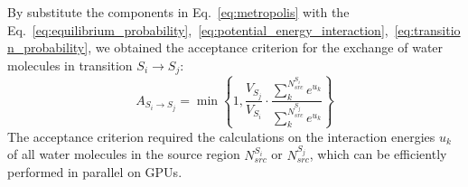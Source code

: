 \documentclass[journal=jacsat,manuscript=article]{achemso}
\begin{document}
By substitute the components in Eq.~\ref{eq:metropolis} with the Eq.~\ref{eq:equilibrium_probability},~\ref{eq:potential_energy_interaction},~\ref{eq:transition_probability},
we obtained the acceptance criterion for the exchange of water molecules in transition $S_i \to S_j$:
\begin{equation}\label{eq:acceptance_criterion}
A_{S_i \to S_j} = \min \left\{1, \frac{V_{S_j}}{V_{S_i}} \cdot \frac{\sum^{N^{S_i}_{src}}_k{e^{u_k}}}{\sum^{N^{S_j}_{src}}_k{e^{u_k}}} \right\}
\end{equation}
\noindent The acceptance criterion required the calculations on the interaction energies $u_k$ of all water molecules in the source region $N^{S_i}_{src}$ or $N^{S_j}_{src}$,
which can be efficiently performed in parallel on GPUs.
\end{document}
